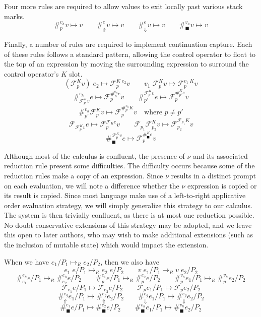 \documentclass[11pt]{article}
\newcommand\F{\mathcal{F}}
\begin{document}
Four more rules are required to allow values to exit locally past various stack marks.
$$\#_p^{v_h} v \mapsto v \qquad
  \#_{\Uparrow}^{e}v \mapsto v \qquad
  \#_{\Downarrow}^{e}v \mapsto v \qquad
  \#_\blacksquare^{v_h}v \mapsto v$$

Finally, a number of rules are required to implement continuation capture.
Each of these rules follows a standard pattern, allowing the control operator to float to the top of an expression by moving the surrounding expression to surround the control operator's $K$ slot.
$$(\F^K_pv)\;e_2 \mapsto \F^{K\;e_2}_pv \qquad
  v_1\;\F^K_pv \mapsto \F^{v_1\;K}_pv$$
$$\#_{\F_p^Kv}^{e_h}e \mapsto \F_p^{\#_K^{e_h}e}v \qquad
  \#^{\F_p^Kv}_{p'}e \mapsto \F_p^{\#^K_{p'}e}v$$
$$\#_{p'}^{v_h}\F^K_pv \mapsto \F^{\#_{p'}^{v_h}K}_pv
  	\quad\textrm{where }p \neq p'$$
$$\F_{\F^K_pv}e \mapsto \F^{\F_Ke}_pv \qquad
  \F_{p_1}\F^K_{p_2}v \mapsto \F^{\F_{p_1}K}_{p_2}v$$
$$\#_\blacksquare^{\F_p^K v}e \mapsto \F_p^{\#_\blacksquare^K e}v$$

Although most of the calculus is confluent, the presence of $\nu$ and its associated reduction rule present some difficulties.
The difficulty occurs because some of the reduction rules make a copy of an expression.
Since $\nu$ results in a distinct prompt on each evaluation, we will note a difference whether the $\nu$ expression is copied or its result is copied.
Since most language make use of a left-to-right applicative order evaluation strategy, we will simply generalize this strategy to our calculus.
The system is then trivially confluent, as there is at most one reduction possible.
No doubt conservative extensions of this strategy may be adopted, and we leave this open to later authors, who may wish to make additional extensions (such as the inclusion of mutable state) which would impact the extension.

When we have $e_1/P_1 \mapsto_R e_2/P_2$, then we also have
$$e_1\;e/P_1 \mapsto_R e_2\;e/P_2 \qquad
  v\;e_1/P_1 \mapsto_R v\;e_2/P_2$$
$$\#_{e_1}^{e_h}e/P_1 \mapsto_R \#_{e_2}^{e_h}e/P_2 \qquad
  \#_{p}^{e_1}e/P_1 \mapsto_R \#_{p}^{e_2}e/P_2 \qquad
  \#_{p}^{v_h}e_1/P_1 \mapsto_R \#_{p}^{v_h}e_2/P_2$$
$$\F_{e_1} e/P_1 \mapsto \F_{e_2} e/P_2 \qquad
  \F_{p} e_1/P_1 \mapsto \F_{p} e_2/P_2$$
$$\#_\Uparrow^{e_g}e_1/P_1 \mapsto \#_\Uparrow^{e_g}e_2/P_2 \qquad
  \#_\Downarrow^{e_g}e_1/P_1 \mapsto \#_\Downarrow^{e_g}e_2/P_2$$
$$\#_\blacksquare^{e_1}e/P_1 \mapsto \#_\blacksquare^{e_2}e/P_2 \qquad
  \#_\blacksquare^{v_h}e_1/P_1 \mapsto \#_\blacksquare^{v_h}e_2/P_2$$
\end{document}

